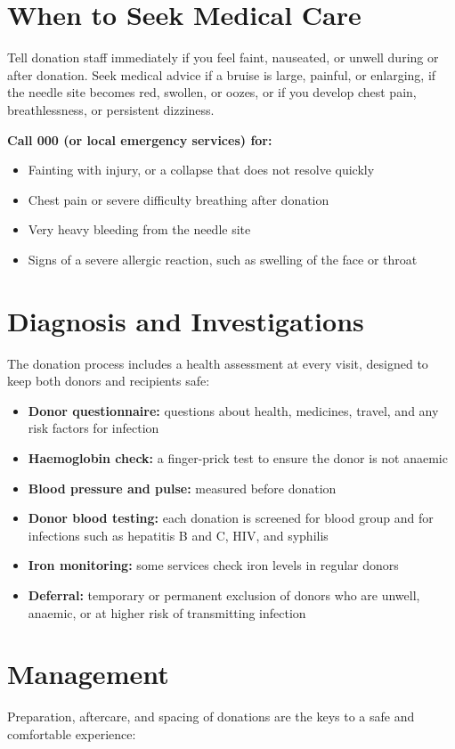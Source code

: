 \section*{When to Seek Medical Care}
Tell donation staff immediately if you feel faint, nauseated, or unwell during or after donation. Seek medical advice if a bruise is large, painful, or enlarging, if the needle site becomes red, swollen, or oozes, or if you develop chest pain, breathlessness, or persistent dizziness.

\textbf{Call 000 (or local emergency services) for:}
\begin{itemize}
    \item Fainting with injury, or a collapse that does not resolve quickly
    \item Chest pain or severe difficulty breathing after donation
    \item Very heavy bleeding from the needle site
    \item Signs of a severe allergic reaction, such as swelling of the face or throat
\end{itemize}

\section*{Diagnosis and Investigations}
The donation process includes a health assessment at every visit, designed to keep both donors and recipients safe:

\begin{itemize}
    \item \textbf{Donor questionnaire:} questions about health, medicines, travel, and any risk factors for infection
    \item \textbf{Haemoglobin check:} a finger-prick test to ensure the donor is not anaemic
    \item \textbf{Blood pressure and pulse:} measured before donation
    \item \textbf{Donor blood testing:} each donation is screened for blood group and for infections such as hepatitis B and C, HIV, and syphilis
    \item \textbf{Iron monitoring:} some services check iron levels in regular donors
    \item \textbf{Deferral:} temporary or permanent exclusion of donors who are unwell, anaemic, or at higher risk of transmitting infection
\end{itemize}

\section*{Management}
Preparation, aftercare, and spacing of donations are the keys to a safe and comfortable experience:

